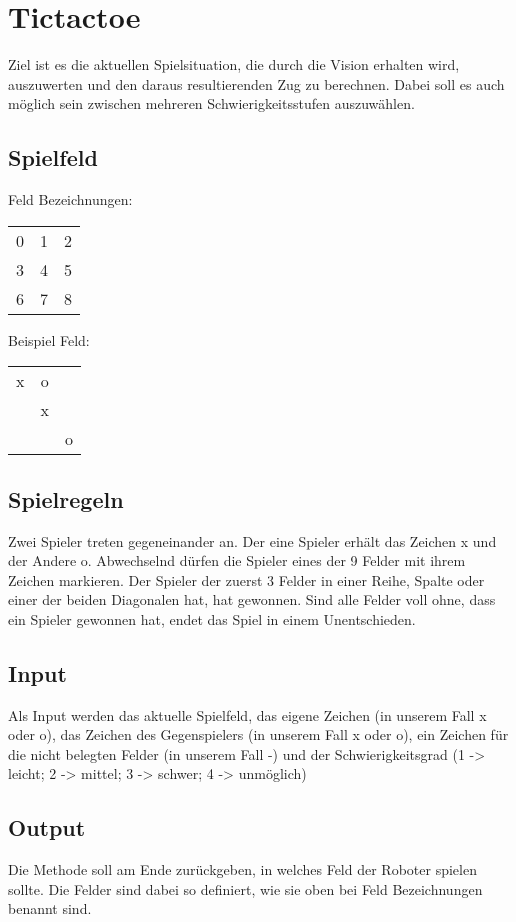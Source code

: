 \section{Tictactoe}
Ziel ist es die aktuellen Spielsituation, die durch die Vision erhalten wird, auszuwerten und den daraus resultierenden Zug zu berechnen. Dabei soll es auch möglich sein zwischen mehreren Schwierigkeitsstufen auszuwählen.

\subsection{Spielfeld}
Feld Bezeichnungen:
\begin{tabular}{ |c|c|c| } 
 \hline
 0& 1& 2\\ 
 3& 4& 5\\ 
 6& 7& 8\\ 
 \hline
\end{tabular}

Beispiel Feld:
\begin{tabular}{ |c|c|c| } 
 \hline
 x& o& \\ 
 & x& \\ 
 & & o\\ 
 \hline
\end{tabular}

\subsection{Spielregeln}
Zwei Spieler treten gegeneinander an. Der eine Spieler erhält das Zeichen x und der Andere o. Abwechselnd dürfen die Spieler eines der 9 Felder mit ihrem Zeichen markieren. Der Spieler der zuerst 3 Felder in einer Reihe, Spalte oder einer der beiden Diagonalen hat, hat gewonnen. Sind alle Felder voll ohne, dass ein Spieler gewonnen hat, endet das Spiel in einem Unentschieden. 

\subsection{Input}
Als Input werden das aktuelle Spielfeld, das eigene Zeichen (in unserem Fall x oder o), das Zeichen des Gegenspielers (in unserem Fall x oder o), ein Zeichen für die nicht belegten Felder (in unserem Fall -) und der Schwierigkeitsgrad (1 -> leicht; 2 -> mittel; 3 -> schwer; 4 -> unmöglich)

\subsection{Output}
Die Methode soll am Ende zurückgeben, in welches Feld der Roboter spielen sollte. Die Felder sind dabei so definiert, wie sie oben bei Feld Bezeichnungen benannt sind. 

